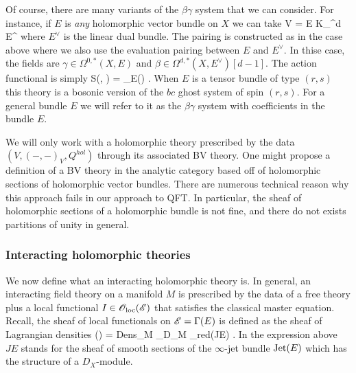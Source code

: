 Of course, there are many variants of the $\beta\gamma$ system that we can consider.
For instance, if $E$ is {\em any} holomorphic vector bundle on $X$ we can take 
\ben
V = E \oplus K_{\CC^d} \tensor E^\vee
\een
where $E^\vee$ is the linear dual bundle. 
The pairing is constructed as in the case above where we also use the evaluation pairing between $E$ and $E^\vee$.
In thise case, the fields are $\gamma \in \Omega^{0,*}(X, E)$ and $\beta \in \Omega^{d,*}(X, E^\vee)[d-1]$. 
The action functional is simply
\ben
S(\gamma, \beta) = _E(\beta \wedge \dbar \gamma) .
\een
When $E$ is a tensor bundle of type $(r,s)$ this theory is a bosonic version of the $bc$ ghost system of spin $(r,s)$. 
For a general bundle $E$ we will refer to it as the $\beta\gamma$ system with coefficients in the bundle $E$. 


\begin{rmk} 
We will only work with a holomorphic theory prescribed by the data $(V, (-,-)_V, Q^{hol})$ through its associated BV theory.
One might propose a definition of a BV theory in the analytic category based off of holomorphic sections of holomorphic vector bundles. 
There are numerous technical reason why this approach fails in our approach to QFT.
In particular, the sheaf of holomorphic sections of a holomorphic bundle is not fine, and there do not exists partitions of unity in general. 
\end{rmk}

\subsubsection{Interacting holomorphic theories}

\def\olochol{\sO_{\rm loc}^{hol}}

We now define what an interacting holomorphic theory is.
In general, an interacting field theory on a manifold $M$ is prescribed by the data of a free theory plus a local functional $I \in {\mathscr O}_{\rm loc}(\mathscr E)$ that satisfies the classical master equation. 
Recall, the sheaf of local functionals on $\mathscr E = \Gamma(E)$ is defined as the sheaf of Lagrangian densities
\ben
\oloc(\sE) = {\rm Dens}_M \tensor_{D_M} \sO_{red}(JE) .
\een
In the expression above $JE$ stands for the sheaf of smooth sections of the $\infty$-jet bundle ${\rm Jet}(E)$ which has the structure of a $D_X$-module.


